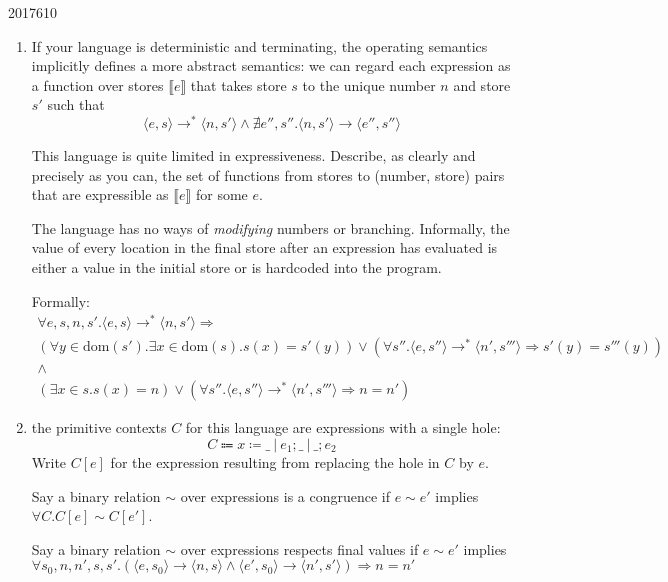 \documentclass[10pt,\jkfside,a4paper]{article}
\begin{document}
\begin{examquestion}{2017}{6}{10}
\begin{enumerate}[label=(\alph*)]
\item If your language is deterministic and terminating, the operating
semantics implicitly defines a more abstract semantics: we can regard each
expression as a function over stores $\llbracket e \rrbracket$ that takes
store $s$ to the unique number $n$ and store $s'$ such that
\[
\langle e, s \rangle
\longrightarrow^*
\langle n, s' \rangle
\wedge
\nexists e'', s''. \langle n, s' \rangle
\longrightarrow
\langle e'', s'' \rangle
\]

This language is quite limited in expressiveness. Describe, as clearly and
precisely as you can, the set of functions from stores to (number, store)
pairs that are expressible as $ \llbracket e \rrbracket $ for some $e$.

The language has no ways of \textit{modifying} numbers or branching.
Informally, the value of every location in the final store after an
expression has evaluated is either a value in the initial store or is
hardcoded into the program.

Formally:
\begin{gather*}
\forall e, s, n, s'. \langle e, s \rangle \to^* \langle n, s' \rangle
\Longrightarrow \\
(\forall y \in \text{dom}(s'). \exists x \in \text{dom}(s). s
(x) = s'(y)) \vee
(\forall s''. \langle e, s'' \rangle \to^* \langle n', s''' \rangle
\Longrightarrow s'(y) = s'''(y)) \\ \wedge \\
(\exists x \in s. s (x) = n) \vee
(\forall s''. \langle e, s''
\rangle \to^* \langle n', s''' \rangle \Longrightarrow n = n')
\end{gather*}

\item the primitive contexts $C$ for this language are expressions with a
single hole:
\[
C \Coloneqq x \coloneqq \_ \ | \ e_1; \_ \ | \ \_; e_2
\]
Write $C[e]$ for the expression resulting from replacing the hole in $C$ by
$e$.

Say a binary relation $\sim$ over expressions is a congruence if $e \sim
e'$ implies $\forall C. C[e] \sim C[e']$.

Say a binary relation $\sim$ over expressions respects final values if $e
\sim e'$ implies $\forall s_0, n, n', s, s'. ( \langle e, s_0 \rangle
\longrightarrow\langle n, s \rangle \wedge \langle e', s_0 \rangle
\longrightarrow \langle n', s' \rangle ) \Longrightarrow n = n' $


\end{enumerate}
\end{examquestion}
\end{document}
